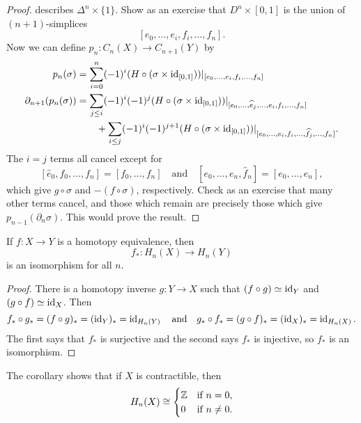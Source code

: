 \begin{proof}
  describes $\Delta^n \times \{1\}$.
  Show as an exercise that $D^n \times [0, 1]$
  is the union of $(n + 1)$-simplices
  \[
    [e_0, \dots, e_i, f_i, \dots, f_n].
  \]
  Now we can define $p_n : C_n(X) \to C_{n + 1}(Y)$
  by
  \begin{align*}
    p_n(\sigma)
    &= \sum_{i = 0}^n (-1)^i (H \circ (\sigma \times \operatorname{id}_{[0, 1]}))|_{[e_0, \dots, e_i, f_i, \dots, f_n]} \\
    \partial_{n + 1}(p_n(\sigma))
    &=
    \sum_{j \le i} (-1)^i (-1)^j (H \circ (\sigma \times \operatorname{id}_{[0, 1]}))|_{[e_0, \dots, \widehat{e}_j, \dots, e_i, f_i, \dots, f_n]} \\
    & \quad \quad + \sum_{i \le j} (-1)^i (-1)^{j + 1} (H \circ (\sigma \times \operatorname{id}_{[0, 1]}))|_{[e_0, \dots, e_i, f_i, \dots, \widehat{f}_j, \dots, f_n]}.
  \end{align*}
  The $i = j$ terms all cancel except for
  \[
    [\widehat{e}_0, f_0, \dots, f_n] = [f_0, \dots, f_n] \quad \text{and} \quad
    [e_0, \dots, e_n, \widehat{f}_n] = [e_0, \dots, e_n],
  \]
  which give $g \circ \sigma$ and
  $-(f \circ \sigma)$, respectively. Check
  as an exercise that many other terms cancel,
  and those which remain are precisely those
  which give $p_{n - 1}(\partial_n \sigma)$.
  This would prove the result.
\end{proof}

\begin{corollary}
  If $f : X \to Y$ is a homotopy equivalence,
  then
  \[f_* : H_n(X) \to H_n(Y)\]
  is an isomorphism for all $n$.
\end{corollary}

\begin{proof}
  There is a homotopy inverse $g : Y \to X$
  such that $(f \circ g) \simeq \operatorname{id}_Y$
  and $(g \circ f) \simeq \operatorname{id}_X$. Then
  \[
    f_* \circ g_* = (f \circ g)_* = (\operatorname{id}_Y)_* = \operatorname{id}_{H_n(Y)}
    \quad \text{and} \quad
    g_* \circ f_* = (g \circ f)_* = (\operatorname{id}_{X})_* = \operatorname{id}_{H_n(X)}.
  \]
  The first says that $f_*$ is surjective and the
  second says $f_*$ is injective, so $f_*$ is
  an isomorphism.
\end{proof}

\begin{remark}
  The corollary shows that if $X$ is contractible,
  then
  \[
    H_n(X)
    \cong
    \begin{cases}
      \mathbb{Z} & \text{if } n = 0, \\
      0 & \text{if } n \ne 0.
    \end{cases}
  \]
\end{remark}

